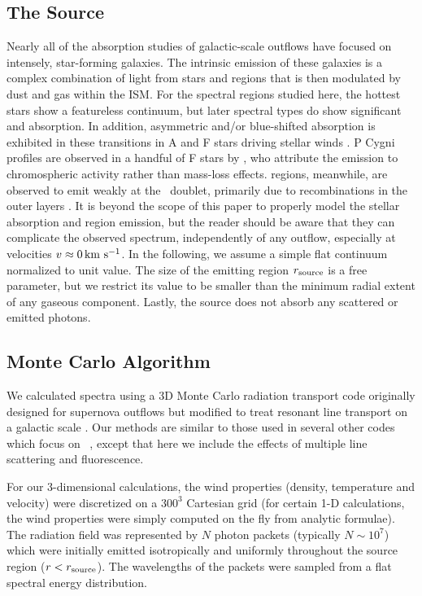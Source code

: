 \documentclass[12pt,preprint]{aastex}
\begin{document}
\subsection{The Source}

Nearly all of the absorption studies of galactic-scale outflows 
have focused on intensely, star-forming galaxies.  The
intrinsic emission of these galaxies is a complex combination of
light from stars and  regions that is then modulated by dust and gas
within the ISM.  For the spectral regions studied
here, the hottest stars show a featureless continuum, but later spectral
types do show significant  and  absorption.
In addition, asymmetric and/or blue-shifted absorption is exhibited in these
transitions in A and F stars driving stellar winds \citep{sll+94}.
 P Cygni profiles are observed in a handful of F stars by \cite{sll+94}, who
attribute the emission to chromospheric activity rather than mass-loss effects.
 regions, meanwhile, are observed to emit weakly
at the \mgiid\ doublet, primarily due to recombinations in the outer
layers \citep{kbc+93}.
It is beyond the scope of this paper to
properly model the 
stellar absorption and  region emission, but the reader
should be aware that they can complicate the observed spectrum,
independently of any outflow, especially at velocities $v \approx 0 \, {\rm km~s^{-1}}$.
In the following, we assume a simple flat continuum 
normalized to unit value.  The size of the emitting
region $r_{\rm source}$ is a free parameter, but we restrict its value
to be smaller than the minimum radial extent of any gaseous
component.   Lastly, the source does not absorb any scattered or
emitted photons.


\subsection{Monte Carlo Algorithm}
\label{sec:monte}


We calculated spectra using a 3D Monte Carlo radiation transport code
originally designed for supernova outflows  \citep{Kasen_2006} but
modified to treat resonant line transport  on a galactic scale
\citep{Kasen_lyman}.  Our methods are similar to those used in several
other codes which focus on \lya\
\citep[e.g.,][]{Zheng_2002,Dijkstra_2006,Verhame_2006,Laursen_2009},
except that here we include the effects of multiple line scattering
and fluorescence. 

For our 3-dimensional calculations, the  wind properties (density, temperature and velocity) were discretized on a $300^3$ Cartesian grid (for certain 1-D calculations, the wind properties were simply computed on the fly from analytic formulae).   
The radiation field was represented by $N$ photon packets (typically $N \sim 10^7$) which were initially emitted isotropically and uniformly throughout the source region ($r < r_{\rm source}$).  The wavelengths of the packets were sampled from a flat spectral energy distribution. 
\end{document}
